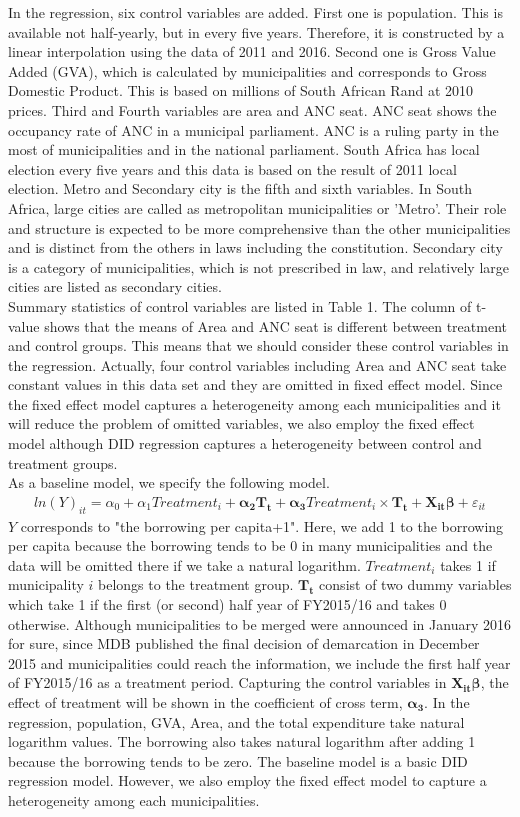 \documentclass[dvipdfmx]{jsarticle}
\begin{document}
\quad In the regression, six control variables are added. First one is population. This is available not half-yearly, but in every five years. Therefore, it is constructed by a linear interpolation using the data of 2011 and 2016. Second one is Gross Value Added (GVA), which is calculated by municipalities and corresponds to Gross Domestic Product. This is based on millions of South African Rand at 2010 prices. Third and Fourth variables are area and ANC seat. ANC seat shows the occupancy rate of ANC in a municipal parliament. ANC is a ruling party in the most of municipalities and in the national parliament. South Africa has local election every five years and this data is based on the result of 2011 local election. Metro and Secondary city is the fifth and sixth variables. In South Africa, large cities are called as metropolitan municipalities or 'Metro'. Their role and structure is expected to be more comprehensive than the other municipalities and is distinct from the others in laws including the constitution. Secondary city is a category of municipalities, which is not prescribed in law, and relatively large cities are listed as secondary cities.\\
\quad Summary statistics of control variables are listed in Table 1. The column of t-value shows that the means of Area and ANC seat is different between treatment and control groups. This means that we should consider these control variables in the regression. Actually, four control variables including Area and ANC seat take constant values in this data set and they are omitted in fixed effect model. Since the fixed effect model captures a heterogeneity among each municipalities and it will reduce the problem of omitted variables, we also employ the fixed effect model although DID regression captures a heterogeneity between control and treatment groups.\\
\quad As a baseline model, we specify the following model.
\begin{align}
ln(Y)_{it}=\alpha_0+\alpha_1Treatment_{i}+\bm{\alpha_2T_t}+\bm{\alpha_3}Treatment_i\times \bm{T_t}+\bm{X_{it}\beta}+\varepsilon_{it}
\end{align}
$Y$ corresponds to "the borrowing per capita+1". Here, we add 1 to the borrowing per capita because the borrowing tends to be 0 in many municipalities and the data will be omitted there if we take a natural logarithm. $Treatment_i$ takes 1 if municipality $i$ belongs to the treatment group. $\bm{T_t}$ consist of two dummy variables which take 1 if the first (or second) half year of FY2015/16 and takes 0 otherwise.  Although municipalities to be merged were announced in January 2016 for sure, since MDB published the final decision of demarcation in December 2015 and municipalities could reach the information, we include the first half year of FY2015/16 as a treatment period. Capturing the control variables in $\bm{X_{it}\beta}$, the effect of treatment will be shown in the coefficient of cross term, $\bm{\alpha_3}$. In the regression, population, GVA, Area, and the total expenditure take natural logarithm values. The borrowing also takes natural logarithm after adding 1 because the borrowing tends to be zero. The baseline model is a basic DID regression model. However, we also employ the fixed effect model to capture a heterogeneity among each municipalities.
\end{document}
